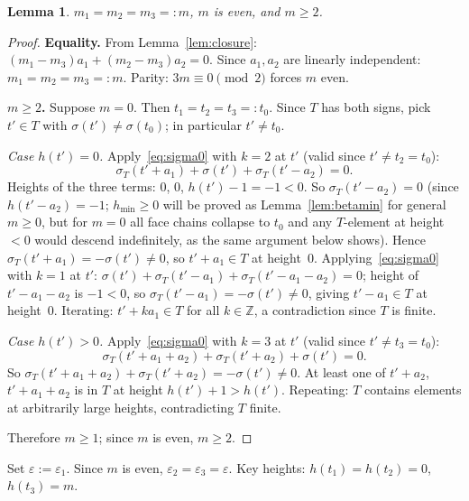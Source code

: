 \documentclass{article}
\newtheorem{lemma}{Lemma}
\begin{document}
\begin{lemma}\label{lem:n3m}
$m_1=m_2=m_3=:m$, $m$ is even, and $m\ge 2$.
\end{lemma}
\begin{proof}
\textbf{Equality.}
From Lemma~\ref{lem:closure}: $(m_1-m_3)a_1+(m_2-m_3)a_2=0$.
Since $a_1,a_2$ are linearly independent: $m_1=m_2=m_3=:m$.
Parity: $3m\equiv 0\pmod 2$ forces $m$ even.

\textbf{$m\ge 2$.}
Suppose $m=0$.  Then $t_1=t_2=t_3=:t_0$.
Since $T$ has both signs, pick $t'\in T$ with $\sigma(t')\ne\sigma(t_0)$; in particular $t'\ne t_0$.

\textit{Case $h(t')=0$.}
Apply~\eqref{eq:sigma0} with $k=2$ at $t'$ (valid since $t'\ne t_2=t_0$):
\[
  \sigma_T(t'+a_1)+\sigma(t')+\sigma_T(t'-a_2)=0.
\]
Heights of the three terms: $0$, $0$, $h(t')-1=-1<0$.
So $\sigma_T(t'-a_2)=0$ (since $h(t'-a_2)=-1$; $h_{\min}\ge 0$ will be proved as Lemma~\ref{lem:betamin} for general $m\ge 0$, but for $m=0$ all face chains collapse to $t_0$ and any $T$-element at height $<0$ would descend indefinitely, as the same argument below shows).
Hence $\sigma_T(t'+a_1)=-\sigma(t')\ne 0$, so $t'+a_1\in T$ at height~$0$.
Applying~\eqref{eq:sigma0} with $k=1$ at $t'$:
$\sigma(t')+\sigma_T(t'-a_1)+\sigma_T(t'-a_1-a_2)=0$;
height of $t'-a_1-a_2$ is $-1<0$, so $\sigma_T(t'-a_1)=-\sigma(t')\ne 0$,
giving $t'-a_1\in T$ at height~$0$.
Iterating: $t'+ka_1\in T$ for all $k\in\mathbb{Z}$, a contradiction since $T$ is finite.

\textit{Case $h(t')>0$.}
Apply~\eqref{eq:sigma0} with $k=3$ at $t'$ (valid since $t'\ne t_3=t_0$):
\[
  \sigma_T(t'+a_1+a_2)+\sigma_T(t'+a_2)+\sigma(t')=0.
\]
So $\sigma_T(t'+a_1+a_2)+\sigma_T(t'+a_2)=-\sigma(t')\ne 0$.
At least one of $t'+a_2$, $t'+a_1+a_2$ is in $T$ at height $h(t')+1>h(t')$.
Repeating: $T$ contains elements at arbitrarily large heights, contradicting $T$ finite.

Therefore $m\ge 1$; since $m$ is even, $m\ge 2$.
\end{proof}

Set $\varepsilon:=\varepsilon_1$.  Since $m$ is even, $\varepsilon_2=\varepsilon_3=\varepsilon$.
Key heights: $h(t_1)=h(t_2)=0$, $h(t_3)=m$.
\end{document}
